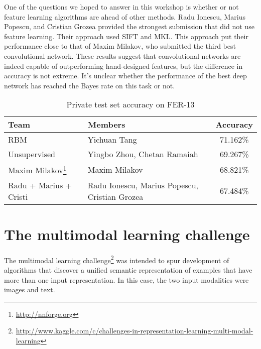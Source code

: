 \documentclass{llncs}
\begin{document}
One of the questions we hoped to answer in this workshop is whether or not feature learning algorithms are ahead of other methods.
Radu Ionescu, Marius Popescu, and Cristian Grozea provided the strongest submission that did not use feature learning. Their approach
used SIFT \citep{Lowe99} and MKL. This approach put their performance close to that of Maxim Milakov, who submitted the third best convolutional network.
These results suggest that convolutional networks are indeed capable of outperforming hand-designed features, but the difference in accuracy
is not extreme. It's unclear whether the performance of the best deep network has reached the Bayes rate on this task or not.

\begin{savenotes}
\begin{table}[t]
\tiny
\caption{Private test set accuracy on FER-13}
\label{fer-leaderboard}
\vskip 0.15in
\begin{center}
\begin{small}
\begin{sc}
\begin{tabular}{p{5cm}|p{5cm}|c}
Team & Members & Accuracy \\
\hline
RBM \citep{Tang-wkshp-2013} & Yichuan Tang & 71.162\%\\
Unsupervised & Yingbo Zhou, Chetan Ramaiah & 69.267\%\\
Maxim Milakov\footnote{\url{http://nnforge.org}} & Maxim Milakov & 68.821\%\\
Radu + Marius + Cristi \citep{Ionescu-wkshp-2013} & Radu Ionescu, Marius Popescu, Cristian Grozea & 67.484\%\\
\end{tabular}
\end{sc}
\end{small}
\end{center}
\vskip -0.1in
\end{table}
\end{savenotes}

\section{The multimodal learning challenge}

The multimodal learning challenge\footnote{\tiny{\url{http://www.kaggle.com/c/challenges-in-representation-learning-multi-modal-learning}}}
was intended to spur development of algorithms that discover a unified
semantic representation of examples that have more than one input representation. In this case,
the two input modalities were images and text.
\end{document}
